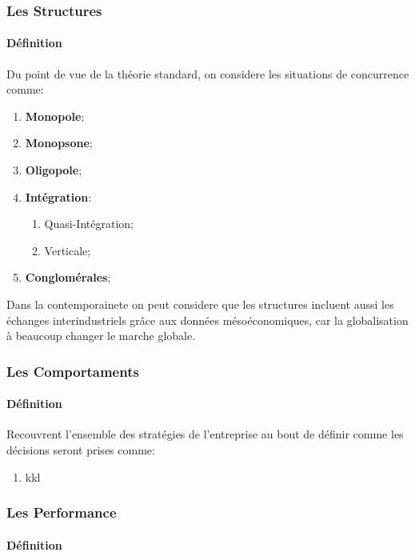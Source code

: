 \documentclass{article}
\begin{document}
\subsubsection{Les Structures}
\paragraph{Définition}Du point de vue de la théorie standard, on considere les situations de concurrence comme:
\begin{enumerate}
    \item \textbf{Monopole};

    \item \textbf{Monopsone};

    \item \textbf{Oligopole};

    \item \textbf{Intégration}:
    \begin{enumerate}[noitemsep]
        \item Quasi-Intégration;
        \item Verticale;
    \end{enumerate}

    \item \textbf{Conglomérales};
\end{enumerate}
Dans la contemporainete on peut considere que les structures incluent aussi les échanges interindustriels grâce aux données mésoéconomiques, car la globalisation à beaucoup changer le marche globale.

\subsubsection{Les Comportaments}
\paragraph{Définition}Recouvrent l'ensemble des stratégies de l'entreprise au bout de définir comme les décisions seront prises comme:
\begin{enumerate}
    \item kkl
\end{enumerate}

\subsubsection{Les Performance}
\paragraph{Définition}
\end{document}
